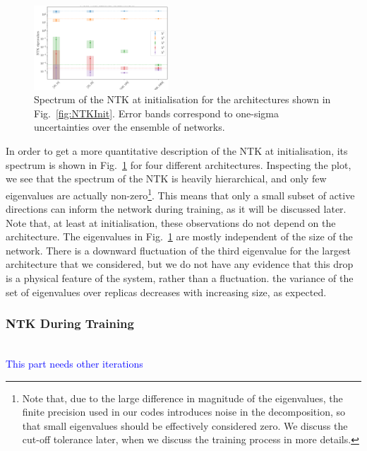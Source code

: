 \begin{figure}[t]
  \centering
  \includegraphics[width=0.45\textwidth]{figs/section_3/ntk_initialization_arch.pdf}
  \caption{Spectrum of the NTK at initialisation for the architectures shown in
  Fig.~\ref{fig:NTKInit}. Error bands correspond to one-sigma uncertainties over
  the ensemble of networks.}
  \label{fig:NTKSpectrum}
\end{figure}

In order to get a more quantitative description of the NTK at initialisation,
its spectrum is shown in Fig.~\ref{fig:NTKSpectrum} for four different
architectures. Inspecting the plot, we see that the spectrum of the NTK is
heavily hierarchical, and only few eigenvalues are actually
non-zero\footnote{Note that, due to the large difference in magnitude of the
eigenvalues, the finite precision used in our codes introduces noise in the
decomposition, so that small eigenvalues should be effectively considered zero.
We discuss the cut-off tolerance later, when we discuss the training process in
more details.}. This means that only a small subset of active directions can
inform the network during training, as it will be discussed later. Note that, at
least at initialisation, these observations do not depend on the architecture.
The eigenvalues in Fig.~\ref{fig:NTKSpectrum} are mostly independent of the size
of the network. There is a downward fluctuation of the third eigenvalue for the
largest architecture that we considered, but we do not have any evidence that
this drop is a physical feature of the system, rather than a fluctuation. the
variance of the set of eigenvalues over replicas decreases with increasing size,
as expected. 


\subsubsection{NTK During Training}
\label{sec:NTKDuringTraining}

\begin{center}
  \\
  \textcolor{blue}{
    This part needs other iterations
  }
\end{center}


